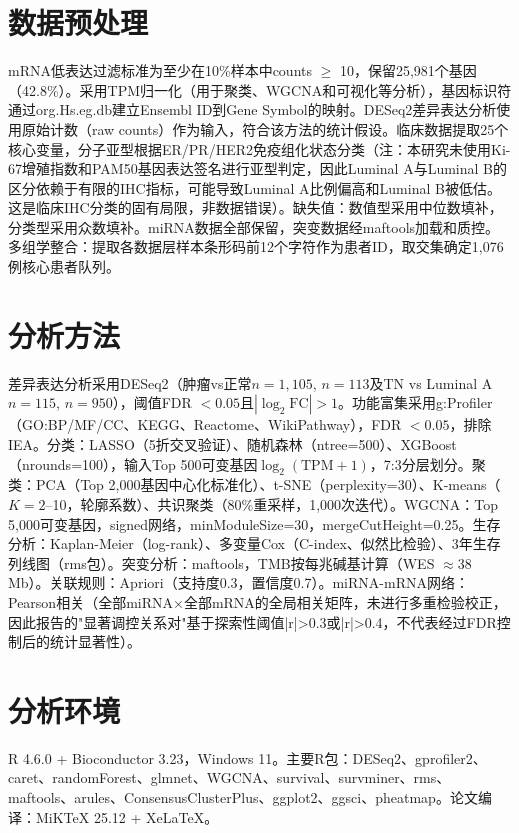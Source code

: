 \documentclass[12pt,a4paper,openany]{ctexbook}
\begin{document}
\section{数据预处理}
mRNA低表达过滤标准为至少在10\%样本中counts $\geq$ 10，保留25,981个基因（42.8\%）。采用TPM归一化（用于聚类、WGCNA和可视化等分析），基因标识符通过org.Hs.eg.db建立Ensembl ID到Gene Symbol的映射。DESeq2差异表达分析使用原始计数（raw counts）作为输入，符合该方法的统计假设。临床数据提取25个核心变量，分子亚型根据ER/PR/HER2免疫组化状态分类（注：本研究未使用Ki-67增殖指数和PAM50基因表达签名进行亚型判定，因此Luminal A与Luminal B的区分依赖于有限的IHC指标，可能导致Luminal A比例偏高和Luminal B被低估。这是临床IHC分类的固有局限，非数据错误）。缺失值：数值型采用中位数填补，分类型采用众数填补。miRNA数据全部保留，突变数据经maftools\cite{mayakonda2018maftools}加载和质控。多组学整合：提取各数据层样本条形码前12个字符作为患者ID，取交集确定1,076例核心患者队列。

\section{分析方法}
差异表达分析采用DESeq2\cite{love2014moderated}（肿瘤vs正常$n=1,105$, $n=113$及TN vs Luminal A $n=115$, $n=950$），阈值FDR $<0.05$且$|\log_2\text{FC}|>1$。功能富集采用g:Profiler\cite{kolberg2023gprofiler}（GO:BP/MF/CC、KEGG、Reactome、WikiPathway），FDR $<0.05$，排除IEA。分类：LASSO（5折交叉验证）、随机森林（ntree=500）、XGBoost（nrounds=100），输入Top 500可变基因$\log_2(\text{TPM}+1)$，7:3分层划分。聚类：PCA（Top 2,000基因中心化标准化）、t-SNE（perplexity=30）、K-means（$K=2$--10，轮廓系数）、共识聚类\cite{wilkerson2010consensus}（80\%重采样，1,000次迭代）。WGCNA\cite{langfelder2008wgcna}：Top 5,000可变基因，signed网络，minModuleSize=30，mergeCutHeight=0.25。生存分析：Kaplan-Meier（log-rank）、多变量Cox（C-index、似然比检验）、3年生存列线图（rms包）。突变分析：maftools\cite{mayakonda2018maftools}，TMB按每兆碱基计算（WES $\approx$38 Mb）。关联规则：Apriori（支持度0.3，置信度0.7）。miRNA-mRNA网络：Pearson相关（全部miRNA×全部mRNA的全局相关矩阵，未进行多重检验校正，因此报告的"显著调控关系对"基于探索性阈值|r|>0.3或|r|>0.4，不代表经过FDR控制后的统计显著性）。

\section{分析环境}
R 4.6.0 + Bioconductor 3.23，Windows 11。主要R包：DESeq2、gprofiler2、caret、randomForest、glmnet、WGCNA、survival、survminer、rms、maftools、arules、ConsensusClusterPlus、ggplot2、ggsci、pheatmap。论文编译：MiKTeX 25.12 + XeLaTeX。
\end{document}
